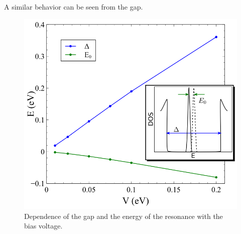 A similar behavior can be seen from the gap.
\begin{figure}[h!]
\centering
\includegraphics{chapter06/figures/gap.png}
\vspace{-5pt}
\caption{Dependence of the gap and the energy of the resonance with the bias voltage.}
\end{figure}
\FloatBarrier



